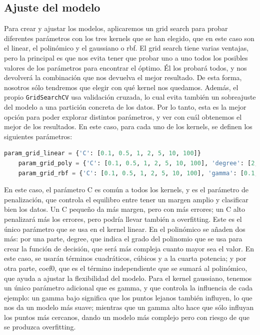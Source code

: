 \documentclass[a4paper,onecolumn]{extarticle}
\begin{document}
\begin{sloppypar}
\subsection{Ajuste del modelo}\label{ajuste}
Para crear y ajustar los modelos, aplicaremos un grid search para probar diferentes parámetros con los tres kernels que se han elegido, que en este caso son el 
linear, el polinómico y el gaussiano o rbf. El grid search tiene varias ventajas, pero la principal es que nos evita tener que probar uno a uno todos los 
posibles valores de los parámetros para encontrar el óptimo. Él los probará todos, y nos devolverá la combinación que nos devuelva el mejor resultado. De esta 
forma, nosotros sólo tendremos que elegir con qué kernel nos quedamos. Además, el propio \texttt{GridSearchCV} usa validación cruzada, lo cual evita también 
un sobreajuste del modelo a una partición concreta de los datos. Por lo tanto, esta es la mejor opción para poder explorar distintos parámetros, y ver con cuál
obtenemos el mejor de los resultados. En este caso, para cada uno de los kernels, se definen los siguientes parámetros:
\begin{lstlisting}[language=Python,]
    param_grid_linear = {'C': [0.1, 0.5, 1, 2, 5, 10, 100]}
    param_grid_poly = {'C': [0.1, 0.5, 1, 2, 5, 10, 100], 'degree': [2, 3, 4], 'coef0': [0, 1, 2]}
    param_grid_rbf = {'C': [0.1, 0.5, 1, 2, 5, 10, 100], 'gamma': [0.1, 0.5, 1, 2, 5]}
\end{lstlisting}

En este caso, el parámetro C es común a todos los kernels, y es el parámetro de penalización, que controla el equilibro entre tener un margen amplio y clasificar 
bien los datos. Un C pequeño da más margen, pero con más errores; un C alto penalizará más los errores, pero podría llevar también a overfitting. Este es el 
único parámetro que se usa en el kernel linear. En el polinómico se añaden dos más: por una parte, degree, que indica el grado del polinomio que se usa para 
crear la función de decisión, que será más compleja cuanto mayor sea el valor. En este caso, se usarán términos cuadráticos, cúbicos y a la cuarta potencia; y 
por otra parte, coef0, que es el término independiente que se sumará al polinómico, que ayuda a ajustar la flexibilidad del modelo. Para el kernel gaussiano, 
tenemos un único parámetro adicional que es gamma, y que controla la influencia de cada ejemplo: un gamma bajo significa que los puntos lejanos también influyen, 
lo que nos da un modelo más suave; mientras que un gamma alto hace que sólo influyan los puntos más cercanos, dando un modelo más complejo pero con riesgo de que 
se produzca overfitting. 


\end{sloppypar}
\end{document}
